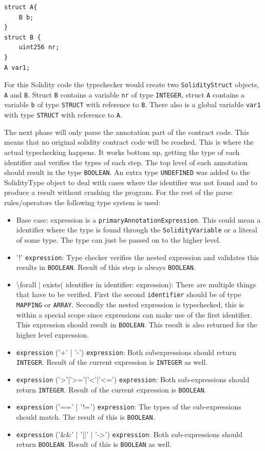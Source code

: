 \documentclass[a4paper]{article}
\begin{document}
\begin{lstlisting}[breaklines=true, language=Solidity ]
struct A{
    B b;
}
struct B {
    uint256 nr;
}
A var1;
\end{lstlisting}
For this Solidity code the typechecker would create two \texttt{SolidityStruct} objects, \texttt{A} and \texttt{B}. Struct \texttt{B} contains a variable \texttt{nr} of type \texttt{INTEGER}, struct \texttt{A} contains a variable \texttt{b} of type \texttt{STRUCT} with reference to \texttt{B}. There also is a global variable \texttt{var1} with type \texttt{STRUCT} with reference to \texttt{A}. \par
The next phase will only parse the annotation part of the contract code. This means that no original solidity contract code will be reached. This is where the actual typechecking happens. It works bottom up, getting the type of each identifier and verifies the types of each step. The top level of each annotation should result in the type \texttt{BOOLEAN}. An extra type \texttt{UNDEFINED} was added to the SolidityType object to deal with cases where the identifier was not found and to produce a result without crashing the program. For the rest of the parse rules/operators the following type system is used:
\begin{itemize}
  \item Base case: expression is a \texttt{primaryAnnotationExpression}. This could mean a identifier where the type is found through the \texttt{SolidityVariable} or a literal of some type. The type can just be passed on to the higher level.
  \item '!' \texttt{expression}: Type checker verifies the nested expression and validates this results in \texttt{BOOLEAN}. Result of this step is always \texttt{BOOLEAN}.
  \item \textbackslash forall | exists( identifier  in identifier: expression): There are multiple things that have to be verified. First the second \texttt{identifier} should be of type \texttt{MAPPING} or \texttt{ARRAY}. Secondly the nested expression is typechecked, this is within a special scope since expressions can make use of the first identifier. This expression should result in \texttt{BOOLEAN}. This result is also returned for the higher level expression.
  \item \texttt{expression} ('+' | '-') \texttt{expression}: Both subexpressions should return \texttt{INTEGER}. Result of the current expression is \texttt{INTEGER} as well.
  \item \texttt{expression} ('>'|'>='|'<'|'<=') \texttt{expression}: Both sub-expressions should return \texttt{INTEGER}. Result of the current expression is \texttt{BOOLEAN}.
  \item \texttt{expression} ('==' | '!=') \texttt{expression}: The types of the sub-expressions should match. The result of this is \texttt{BOOLEAN}.
  \item \texttt{expression} ('\&\&' | '||' | '->') \texttt{expression}: Both sub-expressions should return \texttt{BOOLEAN}. Result of this is \texttt{BOOLEAN} as well.
\end{itemize}
\end{document}
